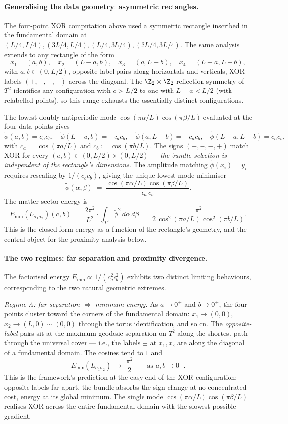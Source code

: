 \paragraph{Generalising the data geometry: asymmetric rectangles.}
The four-point XOR computation above used a symmetric rectangle
inscribed in the fundamental domain at $(L/4,L/4),(3L/4,L/4),
(L/4,3L/4),(3L/4,3L/4)$. The same analysis extends to any rectangle
of the form
\[
   x_1=(a,b),\quad x_2=(L-a,b),\quad x_3=(a,L-b),\quad x_4=(L-a,L-b),
\]
with $a,b\in(0,L/2)$, opposite-label pairs along horizontals and
verticals, XOR labels $(+,-,-,+)$ across the diagonal. The
$\Z_2\times\Z_2$ reflection symmetry of $T^2$ identifies any
configuration with $a>L/2$ to one with $L-a<L/2$ (with relabelled
points), so this range exhausts the essentially distinct
configurations.

The lowest doubly-antiperiodic mode
$\cos(\pi\alpha/L)\cos(\pi\beta/L)$ evaluated at the four data
points gives
\[
   \tilde\phi(a,b)=c_a c_b,\quad
   \tilde\phi(L-a,b)=-c_a c_b,\quad
   \tilde\phi(a,L-b)=-c_a c_b,\quad
   \tilde\phi(L-a,L-b)=c_a c_b,
\]
with $c_a:=\cos(\pi a/L)$ and $c_b:=\cos(\pi b/L)$. The signs
$(+,-,-,+)$ match XOR for every $(a,b)\in(0,L/2)\times(0,L/2)$ ---
\emph{the bundle selection is independent of the rectangle's
dimensions}. The amplitude matching $\tilde\phi(x_i)=y_i$ requires
rescaling by $1/(c_a c_b)$, giving the unique lowest-mode minimiser
\[
   \tilde\phi(\alpha,\beta) \;=\;
   \frac{\cos(\pi\alpha/L)\cos(\pi\beta/L)}{c_a\,c_b}.
\]
The matter-sector energy is
\[
   \boxed{\;\;E_{\min}(L_{\sigma_1\sigma_2})(a,b)
   \;=\; \frac{2\pi^2}{L^2}\cdot
   \int_{T^2}\tilde\phi^2\,d\alpha\,d\beta
   \;=\; \frac{\pi^2}{2\,\cos^2(\pi a/L)\,\cos^2(\pi b/L)}.\;\;}
\]
This is the closed-form energy as a function of the rectangle's
geometry, and the central object for the proximity analysis below.

\paragraph{The two regimes: far separation and proximity divergence.}
The factorised energy $E_{\min}\propto 1/(c_a^2 c_b^2)$ exhibits
two distinct limiting behaviours, corresponding to the two natural
geometric extremes.

\emph{Regime A: far separation $\Leftrightarrow$ minimum energy.}
As $a\to 0^+$ and $b\to 0^+$, the four points cluster toward the
corners of the fundamental domain: $x_1\to(0,0)$, $x_2\to(L,0)\sim
(0,0)$ through the torus identification, and so on. The
\emph{opposite-label} pairs sit at the maximum geodesic separation
on $T^2$ along the shortest path through the universal cover ---
i.e., the labels $\pm$ at $x_1, x_2$ are along the diagonal of a
fundamental domain. The cosines tend to $1$ and
\[
   E_{\min}(L_{\sigma_1\sigma_2}) \;\longrightarrow\; \frac{\pi^2}{2}
   \qquad \text{as } a,b\to 0^+.
\]
This is the framework's prediction at the easy end of the XOR
configuration: opposite labels far apart, the bundle absorbs the
sign change at no concentrated cost, energy at its global minimum.
The single mode $\cos(\pi\alpha/L)\cos(\pi\beta/L)$ realises XOR
across the entire fundamental domain with the slowest possible
gradient.


